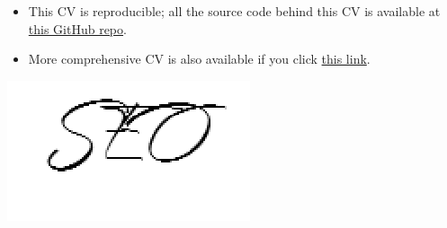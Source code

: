 \documentclass[11pt, a4paper]{awesome-cv}
\begin{document}
\begin{itemize}
\item
  This CV is reproducible; all the source code behind this CV is available at \href{https://github.com/jooyoungseo/jy_CV}{this GitHub repo}.
\item
  More comprehensive CV is also available if you click \href{https://jooyoungseo.github.io/jy_CV/JooYoung_Seo_CV.pdf}{this link}.
\end{itemize}

\includegraphics{../data/signature.png}\\
\end{document}
